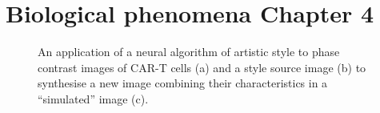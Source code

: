 \section{Biological phenomena Chapter 4}

\begin{figure}[h!]%
    \centering
    \qquad
    \qquad
    \caption{An application of a neural algorithm of artistic style to phase contrast images of CAR-T cells (a) and a style source image (b) to synthesise a new image combining their characteristics in a ``simulated'' image (c).}%
    \label{fig:t_cell_latch}
\end{figure}

